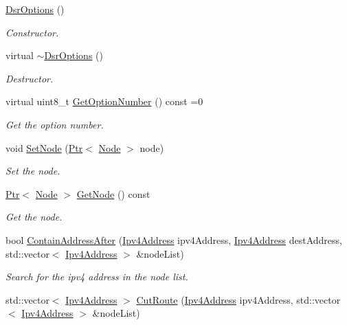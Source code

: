 \begin{DoxyCompactItemize}
\item 
\hyperlink{classns3_1_1dsr_1_1DsrOptions_a26f9dda6f030963939c59ef1ab2a74c0}{Dsr\+Options} ()
\begin{DoxyCompactList}\small\item\em Constructor. \end{DoxyCompactList}\item 
virtual \hyperlink{classns3_1_1dsr_1_1DsrOptions_ac5aaf47e60ca19a9d11e3736c6606c80}{$\sim$\+Dsr\+Options} ()
\begin{DoxyCompactList}\small\item\em Destructor. \end{DoxyCompactList}\item 
virtual uint8\+\_\+t \hyperlink{classns3_1_1dsr_1_1DsrOptions_a31407523e51950f30c95c89602580fc9}{Get\+Option\+Number} () const =0
\begin{DoxyCompactList}\small\item\em Get the option number. \end{DoxyCompactList}\item 
void \hyperlink{classns3_1_1dsr_1_1DsrOptions_a2da86459f60fef3ba822fc446ae17f71}{Set\+Node} (\hyperlink{classns3_1_1Ptr}{Ptr}$<$ \hyperlink{classns3_1_1Node}{Node} $>$ node)
\begin{DoxyCompactList}\small\item\em Set the node. \end{DoxyCompactList}\item 
\hyperlink{classns3_1_1Ptr}{Ptr}$<$ \hyperlink{classns3_1_1Node}{Node} $>$ \hyperlink{classns3_1_1dsr_1_1DsrOptions_ad38b0a32235d7954ba1d9cca00180aa7}{Get\+Node} () const 
\begin{DoxyCompactList}\small\item\em Get the node. \end{DoxyCompactList}\item 
bool \hyperlink{classns3_1_1dsr_1_1DsrOptions_a96e4b43dbea2ac49309abdd0f84a9b0a}{Contain\+Address\+After} (\hyperlink{classns3_1_1Ipv4Address}{Ipv4\+Address} ipv4\+Address, \hyperlink{classns3_1_1Ipv4Address}{Ipv4\+Address} dest\+Address, std\+::vector$<$ \hyperlink{classns3_1_1Ipv4Address}{Ipv4\+Address} $>$ \&node\+List)
\begin{DoxyCompactList}\small\item\em Search for the ipv4 address in the node list. \end{DoxyCompactList}\item 
std\+::vector$<$ \hyperlink{classns3_1_1Ipv4Address}{Ipv4\+Address} $>$ \hyperlink{classns3_1_1dsr_1_1DsrOptions_a8bea995195bd88aab4610af594f099d0}{Cut\+Route} (\hyperlink{classns3_1_1Ipv4Address}{Ipv4\+Address} ipv4\+Address, std\+::vector$<$ \hyperlink{classns3_1_1Ipv4Address}{Ipv4\+Address} $>$ \&node\+List)

\end{DoxyCompactItemize}
